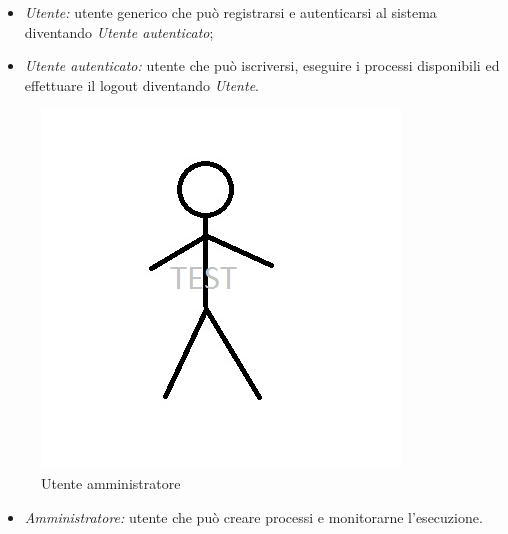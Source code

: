\begin{itemize}
\item \textit{Utente:} utente generico che può registrarsi e autenticarsi al sistema diventando \textit{Utente autenticato};
\item \textit{Utente autenticato:} utente che può iscriversi, eseguire i processi disponibili ed effettuare il logout diventando \textit{Utente}.
\end{itemize}

\begin{figure}[H]
\centering
\includegraphics[width=%
0.25\textwidth{}]{./grafici/example}
\caption{Utente amministratore}
\end{figure}

\begin{itemize}
\item \textit{Amministratore:} utente che può creare processi e monitorarne l'esecuzione.
\end{itemize}